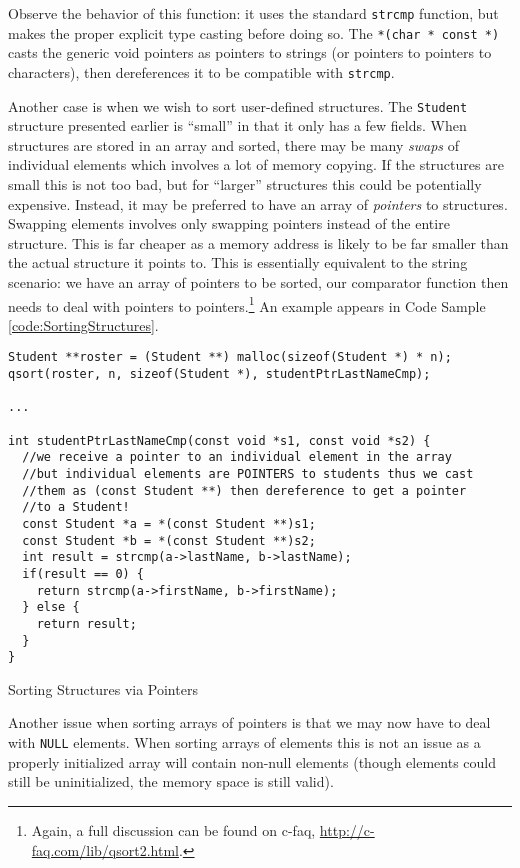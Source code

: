 Observe the behavior of this function: it uses the standard 
\texttt{strcmp} function, but makes the proper explicit type 
casting before doing so.  The \texttt{*(char * const *)} casts 
the generic void pointers as pointers to strings (or pointers to 
pointers to characters), then dereferences it to be compatible
with \texttt{strcmp}.

Another case is when we wish to sort user-defined structures.  The 
\texttt{Student} structure presented earlier is ``small'' in 
that it only has a few fields.  When structures are stored in an 
array and sorted, there may be many \emph{swaps} of individual 
elements which involves a lot of memory copying.  If the structures 
are small this is not too bad, but for ``larger'' structures this 
could be potentially expensive.  Instead, it may be preferred to 
have an array of \emph{pointers} to structures.  Swapping elements 
involves only swapping pointers instead of the entire structure.  
This is far cheaper as a memory address is likely to be far smaller 
than the actual structure it points to.  This is essentially 
equivalent to the string scenario: we have an array of pointers 
to be sorted, our comparator function then needs to deal with pointers 
to pointers.\footnote{Again, a full discussion can be found on c-faq,
\url{http://c-faq.com/lib/qsort2.html}.}  An example appears in Code 
Sample \ref{code:SortingStructures}.

\begin{listing}[H]
\begin{verbatim}
Student **roster = (Student **) malloc(sizeof(Student *) * n);
qsort(roster, n, sizeof(Student *), studentPtrLastNameCmp);

...

int studentPtrLastNameCmp(const void *s1, const void *s2) {
  //we receive a pointer to an individual element in the array
  //but individual elements are POINTERS to students thus we cast 
  //them as (const Student **) then dereference to get a pointer 
  //to a Student!
  const Student *a = *(const Student **)s1;
  const Student *b = *(const Student **)s2;
  int result = strcmp(a->lastName, b->lastName);
  if(result == 0) {
    return strcmp(a->firstName, b->firstName);
  } else {
    return result;
  }
}
\end{verbatim}
\caption{Sorting Structures via Pointers}
\label{code:SortingStructures}
\end{listing}

Another issue when sorting arrays of pointers is that we may now 
have to deal with \texttt{NULL} elements.  When sorting 
arrays of elements this is not an issue as a properly initialized 
array will contain non-null elements (though elements could still
be uninitialized, the memory space is still valid).

